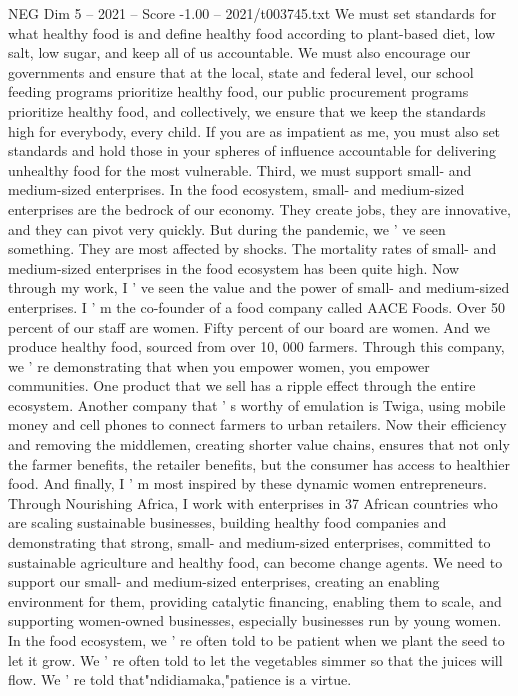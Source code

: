 \begin{textsample}{NEG Dim 5 – 2021 – Score -1.00 – 2021/t003745.txt}
We must set standards for what healthy food is and define healthy food according to plant-based diet, low salt, low sugar, and keep all of us accountable.
We must also encourage our governments and ensure that at the local, state and federal level, our school feeding programs prioritize healthy food, our public procurement programs prioritize healthy food, and collectively, we ensure that we keep the standards high for everybody, every child.
If you are as impatient as me, you must also set standards and hold those in your spheres of influence accountable for delivering unhealthy food for the most vulnerable.
Third, we must support small- and medium-sized enterprises.
In the food ecosystem, small- and medium-sized enterprises are the bedrock of our economy.
They create jobs, they are innovative, and they can pivot very quickly.
But during the pandemic, we ' ve seen something.
They are most affected by shocks.
The mortality rates of small- and medium-sized enterprises in the food ecosystem has been quite high.
Now through my work, I ' ve seen the value and the power of small- and medium-sized enterprises.
I ' m the co-founder of a food company called AACE Foods.
Over 50 percent of our staff are women.
Fifty percent of our board are women.
And we produce healthy food, sourced from over 10, 000 farmers.
Through this company, we ' re demonstrating that when you empower women, you empower communities.
One product that we sell has a ripple effect through the entire ecosystem.
Another company that ' s worthy of emulation is Twiga, using mobile money and cell phones to connect farmers to urban retailers.
Now their efficiency and removing the middlemen, creating shorter value chains, ensures that not only the farmer benefits, the retailer benefits, but the consumer has access to healthier food.
And finally, I ' m most inspired by these dynamic women entrepreneurs.
Through Nourishing Africa, I work with enterprises in 37 African countries who are scaling sustainable businesses, building healthy food companies and demonstrating that strong, small- and medium-sized enterprises, committed to sustainable agriculture and healthy food, can become change agents.
We need to support our small- and medium-sized enterprises, creating an enabling environment for them, providing catalytic financing, enabling them to scale, and supporting women-owned businesses, especially businesses run by young women.
In the food ecosystem, we ' re often told to be patient when we plant the seed to let it grow.
We ' re often told to let the vegetables simmer so that the juices will flow.
We ' re told that"ndidiamaka,"patience is a virtue.

\end{textsample}
